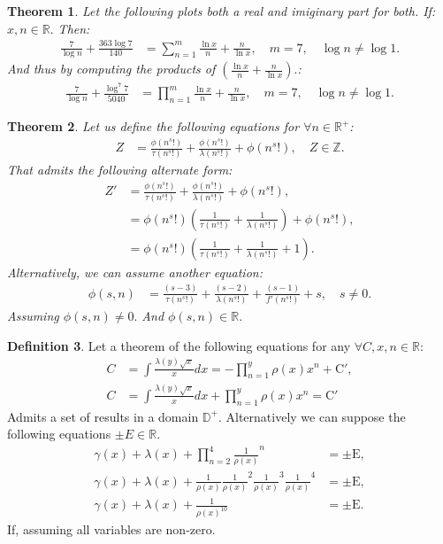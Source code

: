 \documentclass[10pt]{article}
\theoremstyle{plain}
\newtheorem{theorem}{Theorem}[section]
\theoremstyle{definition}
\newtheorem{definition}[theorem]{Definition}
\theoremstyle{remark}
\begin{document}
\begin{theorem}
	Let the following plots both a real and imiginary part for both. If: $x, n \in \mathbb{R}.$ Then:
	\begin{align*}
		\frac{7}{\log n} + \frac{363 \log 7}{140} &= \sum_{n=1}^{m} \frac{\ln x}{n} + \frac{n}{\ln x}, \quad m = 7, \quad \log n \neq \log 1.
	\end{align*}
	And thus by computing the products of $(\frac{\ln x}{n} + \frac{n}{\ln x}).$:
	\begin{align*}
		\frac{7}{\log n} + \frac{\log^{7} 7}{5040} &= \prod_{n=1}^{m} \frac{\ln x}{n} + \frac{n}{\ln x}, \quad m = 7, \quad \log n \neq \log 1.
	\end{align*}
\end{theorem}

\begin{theorem}
	Let us define the following equations for $\forall n \in \mathbb{R}^{+}$:
	\begin{align*}
		Z &= \frac{\phi(n^{s}!)}{\tau(n^{s}!)} + \frac{\phi(n^{s}!)}{\lambda(n^{s}!)} + \phi(n^{s}!), \quad Z \in \mathbb{Z}.
	\end{align*}
	That admits the following alternate form:
	\begin{align*}
		Z' &= \frac{\phi(n^{s}!)}{\tau(n^{s}!)} + \frac{\phi(n^{s}!)}{\lambda(n^{s}!)} + \phi(n^{s}!),\\
		&= \phi(n^{s}!)(\frac{1}{\tau(n^{s}!)} + \frac{1}{\lambda(n^{s}!)}) + \phi(n^{s}!),\\
		&= \phi(n^{s}!)(\frac{1}{\tau(n^{s}!)} + \frac{1}{\lambda(n^{s}!)} + 1).
	\end{align*}
	Alternatively, we can assume another equation:
	\begin{align*}
		\phi(s, n) &= \frac{(s-3)}{\tau(n^{s}!)} + \frac{(s-2)}{\lambda(n^{s}!)} + \frac{(s-1)}{f'(n^{s}!)} + s, \quad s \neq 0.
	\end{align*}
	Assuming $\phi(s, n) \neq 0.$ And $\phi(s, n) \in \mathbb{R}.$
\end{theorem}

\begin{definition}
	Let a theorem of the following equations for any $\forall C, x, n \in \mathbb{R}$:
	\begin{align*}
		C &= \int \frac{\lambda(y) \sqrt{x}}{x} dx = - \prod_{n=1}^{y}\rho(x) x^{n} + \mathrm{C}',\\
		C &= \int \frac{\lambda(y) \sqrt{x}}{x} dx + \prod_{n=1}^{y}\rho(x) x^{n} = \mathrm{C}'
	\end{align*}
	Admits a set of results in a domain $\mathbb{D}^{+}$. Alternatively we can suppose the following equations $\pm E \in \mathbb{R}.$
	\begin{align*}
		\gamma(x)+\lambda(x) + \prod_{n=2}^{4}\frac{1}{\rho(x)}^{n} &= \pm \mathrm{E},\\
		\gamma(x)+\lambda(x) + \frac{1}{\rho(x)} \frac{1}{\rho(x)}^{2} \frac{1}{\rho(x)}^{3} \frac{1}{\rho(x)}^{4} &= \pm \mathrm{E},\\
		\gamma(x)+\lambda(x) + \frac{1}{\rho(x)^{10}} &= \pm \mathrm{E}.
	\end{align*}
	If, assuming all variables are non-zero.
\end{definition}
\end{document}
